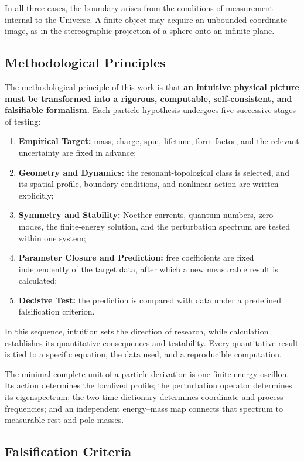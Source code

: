 \documentclass[11pt,a4paper]{article}
\begin{document}
In all three cases, the boundary arises from the conditions of measurement internal to the Universe. A finite object may acquire an unbounded coordinate image, as in the stereographic projection of a sphere onto an infinite plane.
\subsection{Methodological Principles}

The methodological principle of this work is that \textbf{an intuitive physical picture must be transformed into a rigorous, computable, self-consistent, and falsifiable formalism.} Each particle hypothesis undergoes five successive stages of testing:

\begin{enumerate}[label=\arabic*.]
\item \textbf{Empirical Target:} mass, charge, spin, lifetime, form factor, and the relevant uncertainty are fixed in advance;
\item \textbf{Geometry and Dynamics:} the resonant-topological class is selected, and its spatial profile, boundary conditions, and nonlinear action are written explicitly;
\item \textbf{Symmetry and Stability:} Noether currents, quantum numbers, zero modes, the finite-energy solution, and the perturbation spectrum are tested within one system;
\item \textbf{Parameter Closure and Prediction:} free coefficients are fixed independently of the target data, after which a new measurable result is calculated;
\item \textbf{Decisive Test:} the prediction is compared with data under a predefined falsification criterion.
\end{enumerate}

In this sequence, intuition sets the direction of research, while calculation establishes its quantitative consequences and testability. Every quantitative result is tied to a specific equation, the data used, and a reproducible computation.

The minimal complete unit of a particle derivation is one finite-energy oscillon. Its action determines the localized profile; the perturbation operator determines its eigenspectrum; the two-time dictionary determines coordinate and process frequencies; and an independent energy--mass map connects that spectrum to measurable rest and pole masses.

\subsection{Falsification Criteria}
\end{document}
